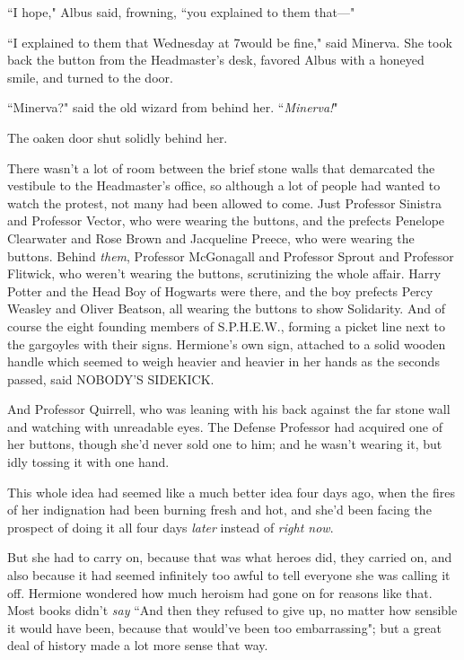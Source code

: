 ``I hope," Albus said, frowning, ``you explained to them that---"

``I explained to them that Wednesday at 7\pm would be fine," said Minerva. She took back the button from the Headmaster's desk, favored Albus with a honeyed smile, and turned to the door.

``Minerva?" said the old wizard from behind her. ``\emph{Minerva!}"

The oaken door shut solidly behind her.

\later

There wasn't a lot of room between the brief stone walls that demarcated the vestibule to the Headmaster's office, so although a lot of people had wanted to watch the protest, not many had been allowed to come. Just Professor Sinistra and Professor Vector, who were wearing the buttons, and the prefects Penelope Clearwater and Rose Brown and Jacqueline Preece, who were wearing the buttons. Behind \emph{them}, Professor McGonagall and Professor Sprout and Professor Flitwick, who weren't wearing the buttons, scrutinizing the whole affair. Harry Potter and the Head Boy of Hogwarts were there, and the boy prefects Percy Weasley and Oliver Beatson, all wearing the buttons to show Solidarity. And of course the eight founding members of S.P.H.E.W., forming a picket line next to the gargoyles with their signs. Hermione's own sign, attached to a solid wooden handle which seemed to weigh heavier and heavier in her hands as the seconds passed, said NOBODY'S SIDEKICK.

And Professor Quirrell, who was leaning with his back against the far stone wall and watching with unreadable eyes. The Defense Professor had acquired one of her buttons, though she'd never sold one to him; and he wasn't wearing it, but idly tossing it with one hand.

This whole idea had seemed like a much better idea four days ago, when the fires of her indignation had been burning fresh and hot, and she'd been facing the prospect of doing it all four days \emph{later} instead of \emph{right now}.

But she had to carry on, because that was what heroes did, they carried on, and also because it had seemed infinitely too awful to tell everyone she was calling it off. Hermione wondered how much heroism had gone on for reasons like that. Most books didn't \emph{say} ``And then they refused to give up, no matter how sensible it would have been, because that would've been too embarrassing"; but a great deal of history made a lot more sense that way.


